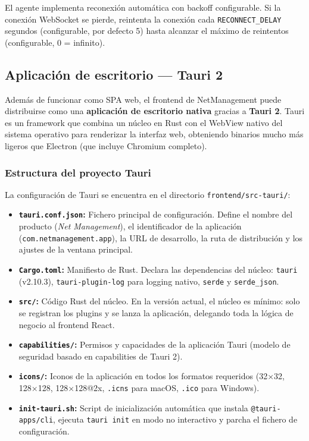 \documentclass[12pt, a4paper, twoside]{article}
\begin{document}
El agente implementa reconexión automática con backoff configurable. Si la conexión WebSocket se pierde, reintenta la conexión cada \texttt{RECONNECT\_DELAY} segundos (configurable, por defecto 5) hasta alcanzar el máximo de reintentos (configurable, 0 = infinito).

\subsection{Aplicación de escritorio — Tauri 2}

Además de funcionar como SPA web, el frontend de NetManagement puede distribuirse como una \textbf{aplicación de escritorio nativa} gracias a \textbf{Tauri 2}. Tauri es un framework que combina un núcleo en Rust con el WebView nativo del sistema operativo para renderizar la interfaz web, obteniendo binarios mucho más ligeros que Electron (que incluye Chromium completo).

\subsubsection{Estructura del proyecto Tauri}

La configuración de Tauri se encuentra en el directorio \texttt{frontend/src-tauri/}:

\begin{itemize}
  \item \textbf{\texttt{tauri.conf.json}:} Fichero principal de configuración. Define el nombre del producto (\textit{Net Management}), el identificador de la aplicación (\texttt{com.netmanagement.app}), la URL de desarrollo, la ruta de distribución y los ajustes de la ventana principal.
  \item \textbf{\texttt{Cargo.toml}:} Manifiesto de Rust. Declara las dependencias del núcleo: \texttt{tauri} (v2.10.3), \texttt{tauri-plugin-log} para logging nativo, \texttt{serde} y \texttt{serde\_json}.
  \item \textbf{\texttt{src/}:} Código Rust del núcleo. En la versión actual, el núcleo es mínimo: solo se registran los plugins y se lanza la aplicación, delegando toda la lógica de negocio al frontend React.
  \item \textbf{\texttt{capabilities/}:} Permisos y capacidades de la aplicación Tauri (modelo de seguridad basado en capabilities de Tauri 2).
  \item \textbf{\texttt{icons/}:} Iconos de la aplicación en todos los formatos requeridos (32×32, 128×128, 128×128@2x, \texttt{.icns} para macOS, \texttt{.ico} para Windows).
  \item \textbf{\texttt{init-tauri.sh}:} Script de inicialización automática que instala \texttt{@tauri-apps/cli}, ejecuta \texttt{tauri init} en modo no interactivo y parcha el fichero de configuración.
\end{itemize}
\end{document}

